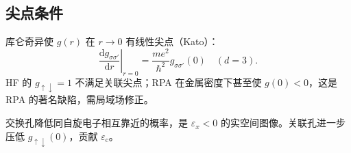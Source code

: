 \subsection{尖点条件}

库仑奇异使 $g(r)$ 在 $r\to0$ 有线性尖点（Kato）：
\begin{equation}
  \left.\frac{\mathrm{d}g_{\sigma\sigma'}}{\mathrm{d}r}\right|_{r=0}
  =\frac{m e^2}{\hbar^2}g_{\sigma\sigma'}(0)
  \quad(d=3).
\end{equation}
HF 的 $g_{\uparrow\downarrow}=1$ 不满足关联尖点；RPA 在金属密度下甚至使 $g(0)<0$，这是 RPA 的著名缺陷，需局域场修正。

\begin{note}
交换孔降低同自旋电子相互靠近的概率，是 $\varepsilon_x<0$ 的实空间图像。关联孔进一步压低 $g_{\uparrow\downarrow}(0)$，贡献 $\varepsilon_{\mathrm{c}}$。
\end{note}
